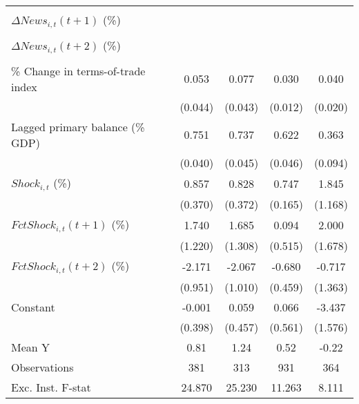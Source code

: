 {\begin{tabular}{l*{4}{c}}
                    &                     &                     &                     &                     \\
\addlinespace
$ \Delta News_{i,t}(t+1)$ (\%)&                     &                     &                     &                     \\
                    &                     &                     &                     &                     \\
\addlinespace
$ \Delta News_{i,t}(t+2)$ (\%)&                     &                     &                     &                     \\
                    &                     &                     &                     &                     \\
\addlinespace
\% Change in terms-of-trade index&       0.053         &       0.077\sym{*}  &       0.030\sym{**} &       0.040\sym{*}  \\
                    &     (0.044)         &     (0.043)         &     (0.012)         &     (0.020)         \\
\addlinespace
Lagged primary balance (\% GDP)&       0.751\sym{***}&       0.737\sym{***}&       0.622\sym{***}&       0.363\sym{***}\\
                    &     (0.040)         &     (0.045)         &     (0.046)         &     (0.094)         \\
\addlinespace
$ Shock_{i,t}$ (\%) &       0.857\sym{**} &       0.828\sym{**} &       0.747\sym{***}&       1.845         \\
                    &     (0.370)         &     (0.372)         &     (0.165)         &     (1.168)         \\
\addlinespace
$ FctShock_{i,t}(t+1)$ (\%)&       1.740         &       1.685         &       0.094         &       2.000         \\
                    &     (1.220)         &     (1.308)         &     (0.515)         &     (1.678)         \\
\addlinespace
$ FctShock_{i,t}(t+2)$ (\%)&      -2.171\sym{**} &      -2.067\sym{*}  &      -0.680         &      -0.717         \\
                    &     (0.951)         &     (1.010)         &     (0.459)         &     (1.363)         \\
\addlinespace
Constant            &      -0.001         &       0.059         &       0.066         &      -3.437\sym{**} \\
                    &     (0.398)         &     (0.457)         &     (0.561)         &     (1.576)         \\
\midrule
Mean Y              &        0.81         &        1.24         &        0.52         &       -0.22         \\
Observations        &         381         &         313         &         931         &         364         \\
Exc. Inst. F-stat   &      24.870         &      25.230         &      11.263         &       8.111         \\
\bottomrule
\end{tabular}
}
